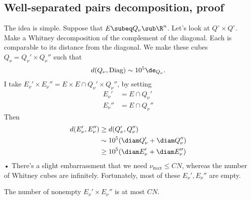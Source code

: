 
\subsection{Well-separated pairs decomposition, proof}

The idea is simple. Suppose that $E\subeq Q_\nu\sub \R^n$. Let's look at $
Q^\circ \times Q^\circ$. 
Make a Whitney decomposition of the complement of the diagonal. Each is comparable to its distance from the diagonal. We make these cubes $Q_\nu=Q_\nu'\times Q_\nu''$ such that 
\begin{align}
d(Q_\nu, \text{Diag}) \sim 10^5 \de_{Q_\nu}. 
\end{align}
I take $E_\nu'\times E_\nu'' = E\times E \cap Q_\nu'\times Q_\nu''$, by setting
\begin{align}
E_\nu' &= E\cap Q_\nu'\\
E_\nu'' &= E\cap Q_\nu''
\end{align}
Then
\begin{align}
d(E_\nu',E_\nu'') &\ge d(Q_\nu', Q_\nu'')\\
&\sim 10^5 (\diam Q_\nu' + \diam Q_\nu'')\\
&\ge 10^5 (\diam E_\nu' + \diam E_\nu'')
\end{align}•
There's a slight embarrassment that we need $\nu_{\max}\le CN$, whereas the number of Whitney cubes are infinitely. Fortunately, most of these $E_\nu',E_\nu''$ are empty.

\begin{lem}
The number of nonempty $E_\nu'\times E_\nu''$ is at most $CN$. 
\end{lem}

